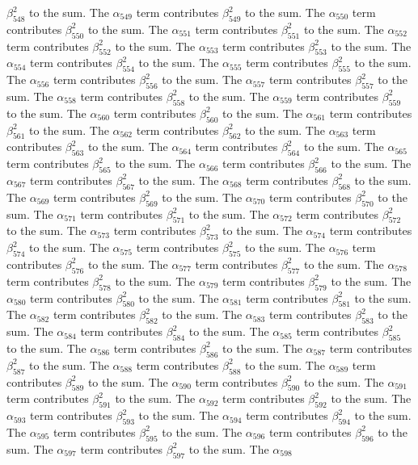 \begin{lemma}
$\beta_{548}^{2}$ to the sum. The $\alpha_{549}$ term contributes $\beta_{549}^{2}$ to the sum. The $\alpha_{550}$ term contributes $\beta_{550}^{2}$ to the sum. The $\alpha_{551}$ term contributes $\beta_{551}^{2}$ to the sum. The $\alpha_{552}$ term contributes $\beta_{552}^{2}$ to the sum. The $\alpha_{553}$ term contributes $\beta_{553}^{2}$ to the sum. The $\alpha_{554}$ term contributes $\beta_{554}^{2}$ to the sum. The $\alpha_{555}$ term contributes $\beta_{555}^{2}$ to the sum. The $\alpha_{556}$ term contributes $\beta_{556}^{2}$ to the sum. The $\alpha_{557}$ term contributes $\beta_{557}^{2}$ to the sum. The $\alpha_{558}$ term contributes $\beta_{558}^{2}$ to the sum. The $\alpha_{559}$ term contributes $\beta_{559}^{2}$ to the sum. The $\alpha_{560}$ term contributes $\beta_{560}^{2}$ to the sum. The $\alpha_{561}$ term contributes $\beta_{561}^{2}$ to the sum. The $\alpha_{562}$ term contributes $\beta_{562}^{2}$ to the sum. The $\alpha_{563}$ term contributes $\beta_{563}^{2}$ to the sum. The $\alpha_{564}$ term contributes $\beta_{564}^{2}$ to the sum. The $\alpha_{565}$ term contributes $\beta_{565}^{2}$ to the sum. The $\alpha_{566}$ term contributes $\beta_{566}^{2}$ to the sum. The $\alpha_{567}$ term contributes $\beta_{567}^{2}$ to the sum. The $\alpha_{568}$ term contributes $\beta_{568}^{2}$ to the sum. The $\alpha_{569}$ term contributes $\beta_{569}^{2}$ to the sum. The $\alpha_{570}$ term contributes $\beta_{570}^{2}$ to the sum. The $\alpha_{571}$ term contributes $\beta_{571}^{2}$ to the sum. The $\alpha_{572}$ term contributes $\beta_{572}^{2}$ to the sum. The $\alpha_{573}$ term contributes $\beta_{573}^{2}$ to the sum. The $\alpha_{574}$ term contributes $\beta_{574}^{2}$ to the sum. The $\alpha_{575}$ term contributes $\beta_{575}^{2}$ to the sum. The $\alpha_{576}$ term contributes $\beta_{576}^{2}$ to the sum. The $\alpha_{577}$ term contributes $\beta_{577}^{2}$ to the sum. The $\alpha_{578}$ term contributes $\beta_{578}^{2}$ to the sum. The $\alpha_{579}$ term contributes $\beta_{579}^{2}$ to the sum. The $\alpha_{580}$ term contributes $\beta_{580}^{2}$ to the sum. The $\alpha_{581}$ term contributes $\beta_{581}^{2}$ to the sum. The $\alpha_{582}$ term contributes $\beta_{582}^{2}$ to the sum. The $\alpha_{583}$ term contributes $\beta_{583}^{2}$ to the sum. The $\alpha_{584}$ term contributes $\beta_{584}^{2}$ to the sum. The $\alpha_{585}$ term contributes $\beta_{585}^{2}$ to the sum. The $\alpha_{586}$ term contributes $\beta_{586}^{2}$ to the sum. The $\alpha_{587}$ term contributes $\beta_{587}^{2}$ to the sum. The $\alpha_{588}$ term contributes $\beta_{588}^{2}$ to the sum. The $\alpha_{589}$ term contributes $\beta_{589}^{2}$ to the sum. The $\alpha_{590}$ term contributes $\beta_{590}^{2}$ to the sum. The $\alpha_{591}$ term contributes $\beta_{591}^{2}$ to the sum. The $\alpha_{592}$ term contributes $\beta_{592}^{2}$ to the sum. The $\alpha_{593}$ term contributes $\beta_{593}^{2}$ to the sum. The $\alpha_{594}$ term contributes $\beta_{594}^{2}$ to the sum. The $\alpha_{595}$ term contributes $\beta_{595}^{2}$ to the sum. The $\alpha_{596}$ term contributes $\beta_{596}^{2}$ to the sum. The $\alpha_{597}$ term contributes $\beta_{597}^{2}$ to the sum. The $\alpha_{598}$ 
\end{lemma}
